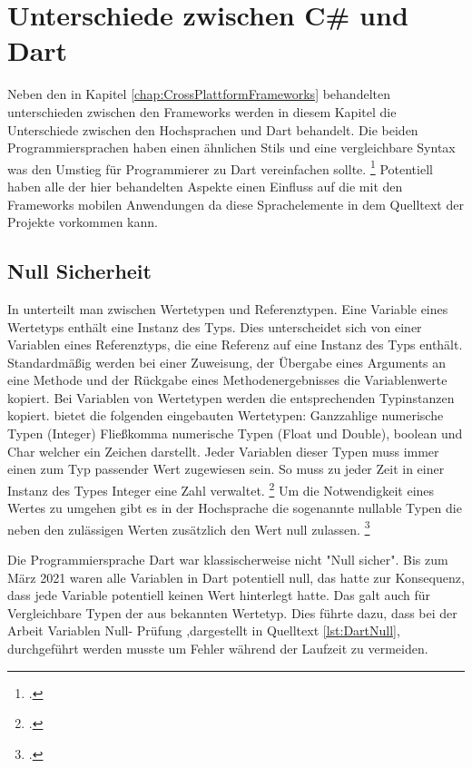 \chapter{Unterschiede zwischen C\# und Dart}
\label{chap:Programmiersprachen}

Neben den in Kapitel \ref{chap:CrossPlattformFrameworks} behandelten unterschieden zwischen den Frameworks werden in diesem Kapitel die Unterschiede zwischen den Hochsprachen \Csharp und Dart behandelt.  Die beiden Programmiersprachen haben einen ähnlichen Stils und eine vergleichbare Syntax was den Umstieg für Programmierer zu Dart vereinfachen sollte.  \footcite[Vgl. ][Abgerufen am \today]{Pedley2019} Potentiell haben alle der hier behandelten Aspekte einen Einfluss auf die mit den Frameworks mobilen Anwendungen da diese Sprachelemente in dem Quelltext der Projekte vorkommen kann.  

\section{Null Sicherheit}
In \Csharp unterteilt man zwischen Wertetypen und Referenztypen.  Eine Variable eines Wertetyps enthält eine Instanz des Typs.  Dies unterscheidet sich von einer Variablen eines Referenztyps, die eine Referenz auf eine Instanz des Typs enthält.  Standardmäßig werden bei einer Zuweisung,  der Übergabe eines Arguments an eine Methode und der Rückgabe eines Methodenergebnisses die Variablenwerte kopiert. Bei Variablen von Wertetypen werden die entsprechenden Typinstanzen kopiert.  \Csharp bietet die folgenden eingebauten Wertetypen: Ganzzahlige numerische Typen (Integer) Fließkomma numerische Typen (Float und Double), boolean und Char welcher ein Zeichen darstellt.  Jeder Variablen dieser  Typen muss immer einen zum Typ passender Wert zugewiesen sein.  So muss zu jeder Zeit in einer Instanz des Types Integer eine Zahl verwaltet. \footcite[Vgl. ][Abgerufen am \today]{MicrosoftValueTypes2020} Um die Notwendigkeit eines Wertes zu umgehen gibt es in der Hochsprache die sogenannte nullable Typen die neben den zulässigen Werten zusätzlich den Wert null zulassen. \footcite[Vgl.][S. 167]{Bayer2008} 

Die Programmiersprache Dart war klassischerweise nicht "Null sicher".  Bis zum März 2021 waren alle Variablen in Dart potentiell null,  das hatte zur Konsequenz, dass jede Variable potentiell keinen Wert hinterlegt hatte.   Das galt auch für Vergleichbare Typen der aus \Csharp bekannten Wertetyp.  Dies führte dazu,  dass bei der Arbeit Variablen Null- Prüfung ,dargestellt in Quelltext \ref{lst:DartNull},  durchgeführt werden musste um Fehler während der Laufzeit zu vermeiden.

